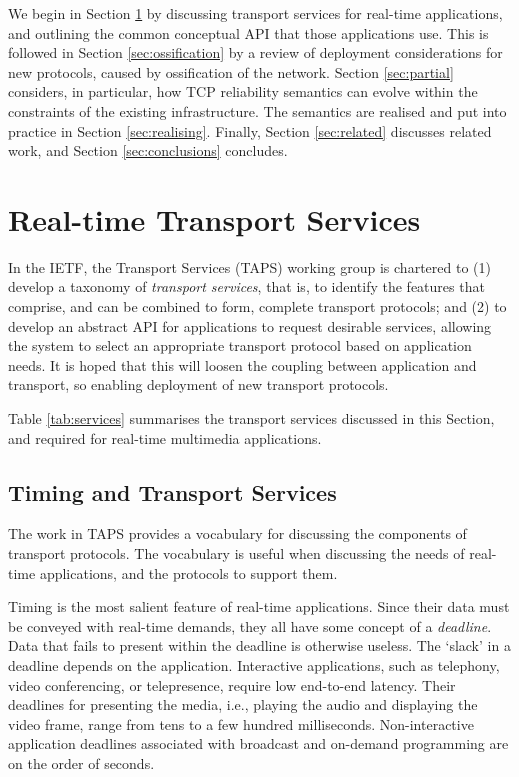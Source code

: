 \documentclass[10pt]{sig-alternate-05-2015}
\newcommand{\ie}{{i.e.,}\xspace}
\begin{document}
We begin in Section \ref{sec:services} by discussing transport
services for real-time applications, and outlining the common
conceptual API that those applications use. This is followed in
Section \ref{sec:ossification} by a review of deployment
considerations for new protocols, caused by ossification of the
network. Section \ref{sec:partial} considers, in particular, how TCP
reliability semantics can evolve within the constraints of the
existing infrastructure. The semantics are realised and put into
practice in Section \ref{sec:realising}.
Finally, Section \ref{sec:related} discusses related work, and Section
\ref{sec:conclusions} concludes.

\section{Real-time Transport Services}
\label{sec:services}

In the IETF, the Transport Services (TAPS) working group is chartered to
(1) develop a taxonomy of \emph{transport services}, that is, to identify the
features that comprise, and can be combined to form, complete transport
protocols; and (2) to develop an abstract API for applications to request
desirable services, allowing the system to select an appropriate transport
protocol based on application needs. It is hoped that this will loosen the
coupling between application and transport, so enabling deployment of new
transport protocols.

Table \ref{tab:services} summarises the transport services discussed in this
Section, and required for real-time multimedia applications.
\subsection{Timing and Transport Services}

The work in TAPS provides a vocabulary for discussing the components of
transport protocols.  The vocabulary is useful when discussing the needs of
real-time applications, and the protocols to support them.

Timing is the most salient feature of real-time applications. Since their data
must be conveyed with real-time demands, they all have some concept of a
\emph{deadline}. Data that fails to present within the deadline is otherwise
useless.
The `slack' in a deadline depends on the application. Interactive applications,
such as telephony, video conferencing, or telepresence, require low end-to-end
latency. Their deadlines for presenting the media, \ie playing the audio and
displaying the video frame, range from tens to a few hundred milliseconds.
Non-interactive application deadlines associated with broadcast and on-demand
programming are on the order of seconds.
\end{document}
